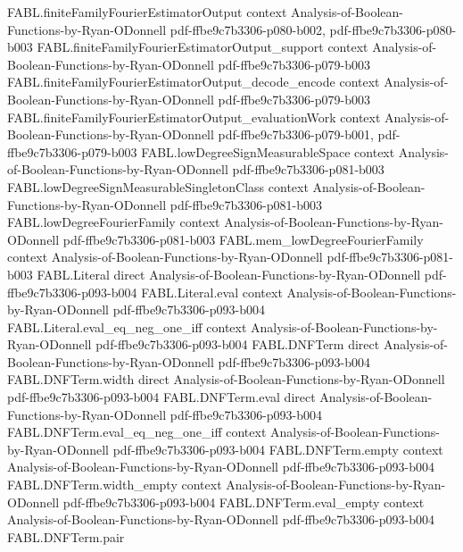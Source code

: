 \begin{theorem}
\proofstep
  {FABL.finiteFamilyFourierEstimatorOutput}
  {context}
  {Analysis-of-Boolean-Functions-by-Ryan-ODonnell}
  {pdf-ffbe9c7b3306-p080-b002,
    pdf-ffbe9c7b3306-p080-b003}
\proofstep
  {FABL.finiteFamilyFourierEstimatorOutput_support}
  {context}
  {Analysis-of-Boolean-Functions-by-Ryan-ODonnell}
  {pdf-ffbe9c7b3306-p079-b003}
\proofstep
  {FABL.finiteFamilyFourierEstimatorOutput_decode_encode}
  {context}
  {Analysis-of-Boolean-Functions-by-Ryan-ODonnell}
  {pdf-ffbe9c7b3306-p079-b003}
\proofstep
  {FABL.finiteFamilyFourierEstimatorOutput_evaluationWork}
  {context}
  {Analysis-of-Boolean-Functions-by-Ryan-ODonnell}
  {pdf-ffbe9c7b3306-p079-b001,
    pdf-ffbe9c7b3306-p079-b003}
\proofstep
  {FABL.lowDegreeSignMeasurableSpace}
  {context}
  {Analysis-of-Boolean-Functions-by-Ryan-ODonnell}
  {pdf-ffbe9c7b3306-p081-b003}
\proofstep
  {FABL.lowDegreeSignMeasurableSingletonClass}
  {context}
  {Analysis-of-Boolean-Functions-by-Ryan-ODonnell}
  {pdf-ffbe9c7b3306-p081-b003}
\proofstep
  {FABL.lowDegreeFourierFamily}
  {context}
  {Analysis-of-Boolean-Functions-by-Ryan-ODonnell}
  {pdf-ffbe9c7b3306-p081-b003}
\proofstep
  {FABL.mem_lowDegreeFourierFamily}
  {context}
  {Analysis-of-Boolean-Functions-by-Ryan-ODonnell}
  {pdf-ffbe9c7b3306-p081-b003}
\proofstep
  {FABL.Literal}
  {direct}
  {Analysis-of-Boolean-Functions-by-Ryan-ODonnell}
  {pdf-ffbe9c7b3306-p093-b004}
\proofstep
  {FABL.Literal.eval}
  {context}
  {Analysis-of-Boolean-Functions-by-Ryan-ODonnell}
  {pdf-ffbe9c7b3306-p093-b004}
\proofstep
  {FABL.Literal.eval_eq_neg_one_iff}
  {context}
  {Analysis-of-Boolean-Functions-by-Ryan-ODonnell}
  {pdf-ffbe9c7b3306-p093-b004}
\proofstep
  {FABL.DNFTerm}
  {direct}
  {Analysis-of-Boolean-Functions-by-Ryan-ODonnell}
  {pdf-ffbe9c7b3306-p093-b004}
\proofstep
  {FABL.DNFTerm.width}
  {direct}
  {Analysis-of-Boolean-Functions-by-Ryan-ODonnell}
  {pdf-ffbe9c7b3306-p093-b004}
\proofstep
  {FABL.DNFTerm.eval}
  {direct}
  {Analysis-of-Boolean-Functions-by-Ryan-ODonnell}
  {pdf-ffbe9c7b3306-p093-b004}
\proofstep
  {FABL.DNFTerm.eval_eq_neg_one_iff}
  {context}
  {Analysis-of-Boolean-Functions-by-Ryan-ODonnell}
  {pdf-ffbe9c7b3306-p093-b004}
\proofstep
  {FABL.DNFTerm.empty}
  {context}
  {Analysis-of-Boolean-Functions-by-Ryan-ODonnell}
  {pdf-ffbe9c7b3306-p093-b004}
\proofstep
  {FABL.DNFTerm.width_empty}
  {context}
  {Analysis-of-Boolean-Functions-by-Ryan-ODonnell}
  {pdf-ffbe9c7b3306-p093-b004}
\proofstep
  {FABL.DNFTerm.eval_empty}
  {context}
  {Analysis-of-Boolean-Functions-by-Ryan-ODonnell}
  {pdf-ffbe9c7b3306-p093-b004}
\proofstep
  {FABL.DNFTerm.pair}

\end{theorem}
